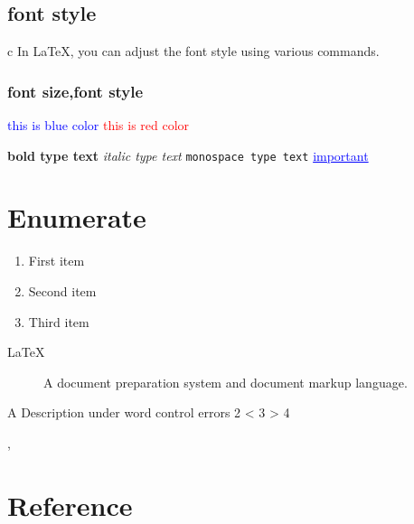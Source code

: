 \documentclass{article}
\begin{document}
    \subsection{font style}
    c In LaTeX, you can adjust the font style using various commands.
    \subsubsection{font size,font style}
    
    \textcolor{blue}{this is blue color}
    \textcolor{red}{this is red color}
    
    \textbf{bold type text}
    \textit{italic type text}
    \texttt{monospace type text}
    \textcolor{blue}{\underline{important}}
    \section{Enumerate}
    \begin{enumerate}
    	\item First item
    	\item Second item
    	\item Third item
    \end{enumerate}
    \begin{description}
    	\item [LaTeX] A document preparation system and document markup language.
    \end{description}
    A Description under \vspace{3cm} word control errors
    2 \textless{} 3  \textgreater{} 4
     
     \cite{sawyer1998software},
     \section{Reference}
     
     
    
    
\end{document}

